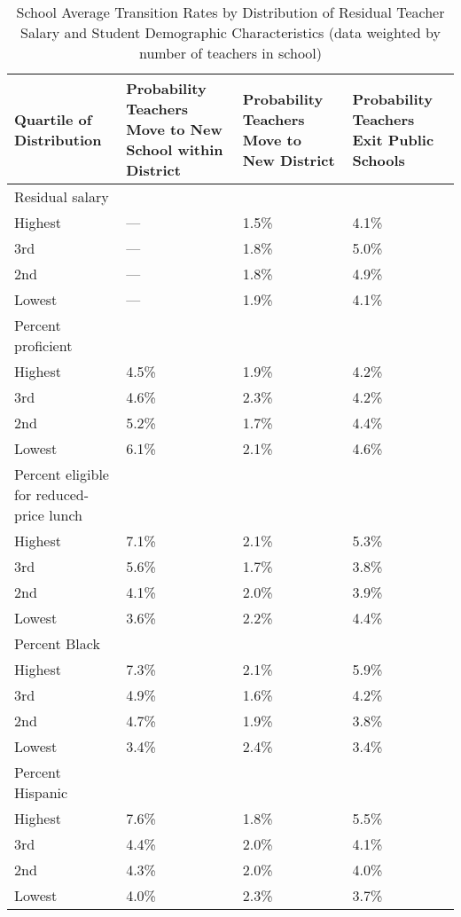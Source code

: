 \begin{table}[htbp]
\centering
\begin{adjustbox}{width=\textwidth,totalheight=0.9\textheight,keepaspectratio}
\begin{tabular}{p{}p{}p{}p{}}
  \hline
Quartile of Distribution & Probability Teachers Move to New School within District & Probability Teachers Move to New District & Probability Teachers Exit Public Schools \\ 
  \hline
Residual salary & & & \\
\quad Highest & --- & 1.5\% & 4.1\% \\ 
  \quad 3rd & --- & 1.8\% & 5.0\% \\ 
  \quad 2nd & --- & 1.8\% & 4.9\% \\ 
  \quad Lowest & --- & 1.9\% & 4.1\% \\ 
Percent proficient & & & \\
  \quad Highest & 4.5\% & 1.9\% & 4.2\% \\ 
  \quad 3rd & 4.6\% & 2.3\% & 4.2\% \\ 
  \quad 2nd & 5.2\% & 1.7\% & 4.4\% \\ 
  \quad Lowest & 6.1\% & 2.1\% & 4.6\% \\ 
Percent eligible for reduced-price lunch & & & \\
  \quad Highest & 7.1\% & 2.1\% & 5.3\% \\ 
  \quad 3rd & 5.6\% & 1.7\% & 3.8\% \\ 
  \quad 2nd & 4.1\% & 2.0\% & 3.9\% \\ 
  \quad Lowest & 3.6\% & 2.2\% & 4.4\% \\ 
Percent Black & & & \\
  \quad Highest & 7.3\% & 2.1\% & 5.9\% \\ 
  \quad 3rd & 4.9\% & 1.6\% & 4.2\% \\ 
  \quad 2nd & 4.7\% & 1.9\% & 3.8\% \\ 
  \quad Lowest & 3.4\% & 2.4\% & 3.4\% \\ 
Percent Hispanic & & & \\
  \quad Highest & 7.6\% & 1.8\% & 5.5\% \\ 
  \quad 3rd & 4.4\% & 2.0\% & 4.1\% \\ 
  \quad 2nd & 4.3\% & 2.0\% & 4.0\% \\ 
  \quad Lowest & 4.0\% & 2.3\% & 3.7\% \\ 
   \hline
\end{tabular}
\end{adjustbox}
\caption{\scriptsize{School Average Transition Rates by Distribution of Residual Teacher Salary and Student Demographic Characteristics (data weighted by number of teachers in school)}} 
\label{tbl:change_by_quartile}
\end{table}

